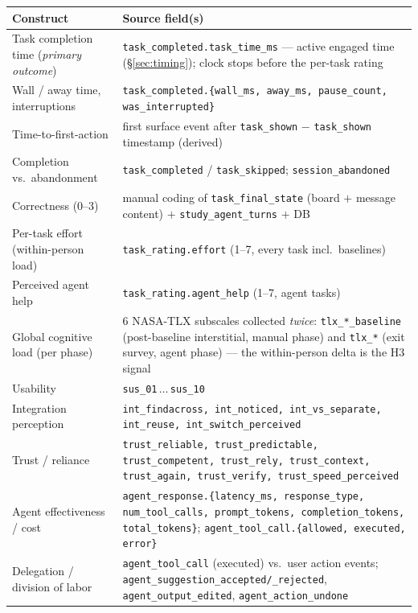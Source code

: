 \documentclass[11pt]{article}
\newcommand{\code}[1]{\texttt{#1}}
\begin{document}
\begin{table}[h]
\centering\small
\begin{tabularx}{\linewidth}{@{}L L@{}}
\toprule
\textbf{Construct} & \textbf{Source field(s)} \\
\midrule
Task completion time (\emph{primary outcome}) & \code{task\_completed.task\_time\_ms} --- active engaged time (\S\ref{sec:timing}); clock stops before the per-task rating \\
Wall / away time, interruptions & \code{task\_completed.\{wall\_ms, away\_ms, pause\_count, was\_interrupted\}} \\
Time-to-first-action & first surface event after \code{task\_shown} $-$ \code{task\_shown} timestamp (derived) \\
Completion vs.\ abandonment & \code{task\_completed} / \code{task\_skipped}; \code{session\_abandoned} \\
Correctness (0--3) & manual coding of \code{task\_final\_state} (board $+$ message content) $+$ \code{study\_agent\_turns} $+$ DB \\
Per-task effort (within-person load) & \code{task\_rating.effort} (1--7, every task incl.\ baselines) \\
Perceived agent help & \code{task\_rating.agent\_help} (1--7, agent tasks) \\
Global cognitive load (per phase) & 6 NASA-TLX subscales collected \emph{twice}: \code{tlx\_*\_baseline} (post-baseline interstitial, manual phase) and \code{tlx\_*} (exit survey, agent phase) --- the within-person delta is the H3 signal \\
Usability & \code{sus\_01}\,$\ldots$\,\code{sus\_10} \\
Integration perception & \code{int\_findacross, int\_noticed, int\_vs\_separate, int\_reuse, int\_switch\_perceived} \\
Trust / reliance & \code{trust\_reliable, trust\_predictable, trust\_competent, trust\_rely, trust\_context, trust\_again, trust\_verify, trust\_speed\_perceived} \\
Agent effectiveness / cost & \code{agent\_response.\{latency\_ms, response\_type, num\_tool\_calls, prompt\_tokens, completion\_tokens, total\_tokens\}}; \code{agent\_tool\_call.\{allowed, executed, error\}} \\
Delegation / division of labor & \code{agent\_tool\_call} (executed) vs.\ user action events; \code{agent\_suggestion\_accepted/\_rejected}, \code{agent\_output\_edited}, \code{agent\_action\_undone} \\

\end{tabularx}
\end{table}
\end{document}
